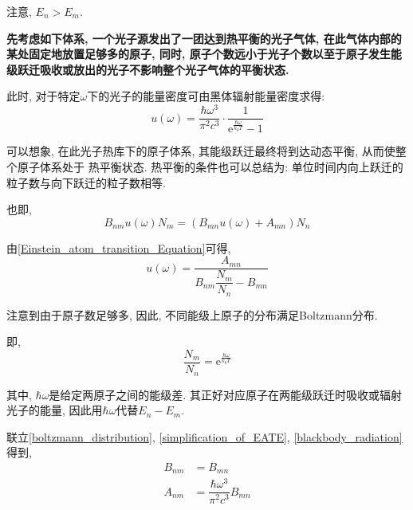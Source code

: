 \documentclass[a4paper, 11pt]{article}
\begin{document}
\begin{spacing}{1.2}
          注意, $E_n>E_m$.
          
          \textbf{
          先考虑如下体系, 一个光子源发出了一团达到热平衡的光子气体, 在此气体内部的某处固定地放置足够多的原子, 
          同时, 原子个数远小于光子个数以至于原子发生能级跃迁吸收或放出的光子不影响整个光子气体的平衡状态.}
          
          此时, 对于特定$\omega$下的光子的能量密度可由黑体辐射能量密度求得:  
          \begin{equation}
            \label{blackbody_radiation}
            u(\omega) = \frac{\hbar\omega^3}{\pi^2c^3}\cdot\frac{1}{\mathrm{e}^
            {\frac{\hbar\omega}{k_0T}}-1}
          \end{equation}
          
          可以想象, 在此光子热库下的原子体系, 其能级跃迁最终将到达动态平衡, 从而使整个原子体系处于
          热平衡状态. 热平衡的条件也可以总结为: 单位时间内向上跃迁的粒子数与向下跃迁的粒子数相等.
          
          也即, 
          \begin{equation}
            \label{Einstein_atom_transition_Equation}
            B_{nm}u(\omega)N_m =\left(B_{mn}u(\omega) + A_{mn}\right)N_n
          \end{equation}
       
          由\eqref{Einstein_atom_transition_Equation}可得, 
          \begin{equation}
            \label{simplification_of_EATE}
            u(\omega) = \dfrac{A_{mn}}{B_{nm}\dfrac{N_m}{N_n}-B_{mn}}
          \end{equation}
          
          注意到由于原子数足够多, 因此, 不同能级上原子的分布满足Boltzmann分布.

          即, 
          \begin{equation}
            \label{boltzmann_distribution}
            \dfrac{N_m}{N_n} = \mathrm{e}^{\frac{\hbar\omega}{k_0T}}
          \end{equation}

          其中, $\hbar\omega$是给定两原子之间的能级差. 其正好对应原子在两能级跃迁时吸收或辐射
          光子的能量, 因此用$\hbar\omega$代替$E_n-E_m$.

          联立\eqref{boltzmann_distribution}, \eqref{simplification_of_EATE}, 
          \eqref{blackbody_radiation}得到,
          \begin{subequations}
            \label{AB_res}
            \begin{align}
              B_{nm} &= B_{mn} \\
              A_{nm} &= \dfrac{\hbar\omega^3}{\pi^2c^3}B_{mn} 
            \end{align}
          \end{subequations}
          

\end{spacing}
\end{document}

